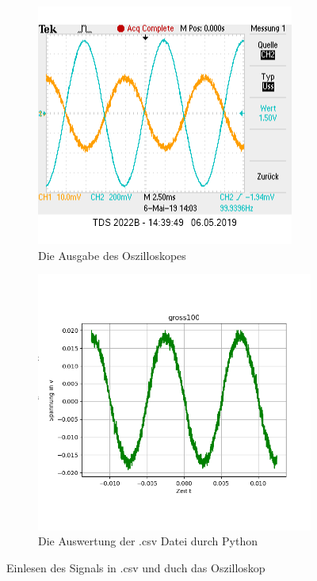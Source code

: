 \documentclass[12pt, oneside, a4paper, \docLanguage]{report}
\begin{document}
\begin{figure}[H]
\centering
\begin{subfigure}{.5\textwidth}
  \centering
  \includegraphics[width=0.9\linewidth]{../data/img/100.png}
  \caption{Die Ausgabe des Oszilloskopes}
  \label{fig:Die Ausgabe des Oszilloskopes}
\end{subfigure}%
\begin{subfigure}{.5\textwidth}
  \centering
  \includegraphics[width=0.9\linewidth]{../data/img/gross100.png}
  \caption{Die Auswertung der .csv Datei durch Python}
  \label{fig:Die Auswertung der .csv Datei durch Python}
\end{subfigure}
\caption{Einlesen des Signals in .csv und duch das Oszilloskop}
\label{fig:Einlesen des Signals in .csv und duch das Oszilloskop}
\end{figure}
\end{document}
